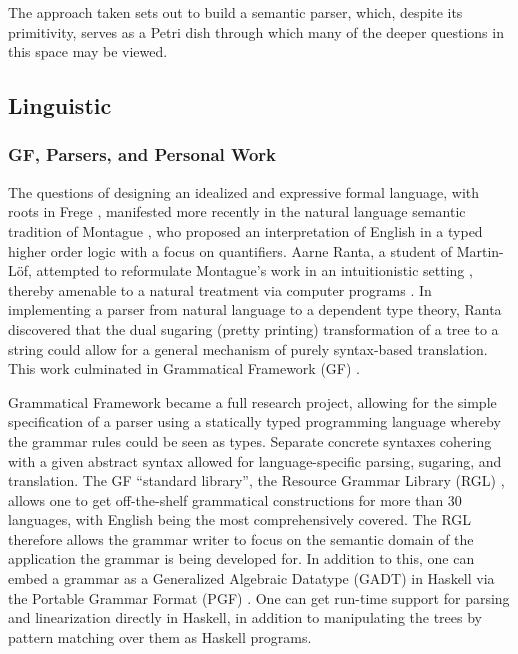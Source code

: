 \documentclass[a4paper, 11pt]{article}
\begin{document}
The approach taken sets out to build a semantic parser, which, despite its
primitivity, serves as a Petri dish through which many of the deeper questions
in this space may be viewed.

\subsection{Linguistic} 

\subsubsection{GF, Parsers, and Personal Work}

The questions of designing an idealized and expressive formal language, with
roots in Frege \cite{frege79}, manifested more recently in the natural language
semantic tradition of Montague \cite{Montague1973}, who proposed an
interpretation of English in a typed higher order logic with a focus on
quantifiers. Aarne Ranta, a student of Martin-Löf, attempted to reformulate
Montague's work in an intuitionistic setting \cite{ranta1994type}, thereby
amenable to a natural treatment via computer programs \cite{ml79}. In
implementing a parser from natural language to a dependent type theory, Ranta
discovered that the dual sugaring (pretty printing) transformation of a tree to
a string could allow for a general mechanism of purely syntax-based translation.
This work culminated in Grammatical Framework (GF) \cite{ranta_2004}.

Grammatical Framework became a full research project, allowing for the simple
specification of a parser using a statically typed programming language whereby
the grammar rules could be seen as types. Separate concrete syntaxes cohering
with a given abstract syntax allowed for language-specific parsing, sugaring,
and translation. The GF ``standard library'', the Resource Grammar Library (RGL)
\cite{ranta2009rgl}, allows one to get off-the-shelf grammatical constructions
for more than 30 languages, with English being the most comprehensively covered. The RGL
therefore allows the grammar writer to focus on the semantic domain of the
application the grammar is being developed for. In addition to this, one can
embed a grammar as a Generalized Algebraic Datatype (GADT) in Haskell via the
Portable Grammar Format (PGF) \cite{angelov2010pgf}. One can get run-time
support for parsing and linearization directly in Haskell, in addition to
manipulating the trees by pattern matching over them as Haskell programs.
\end{document}
